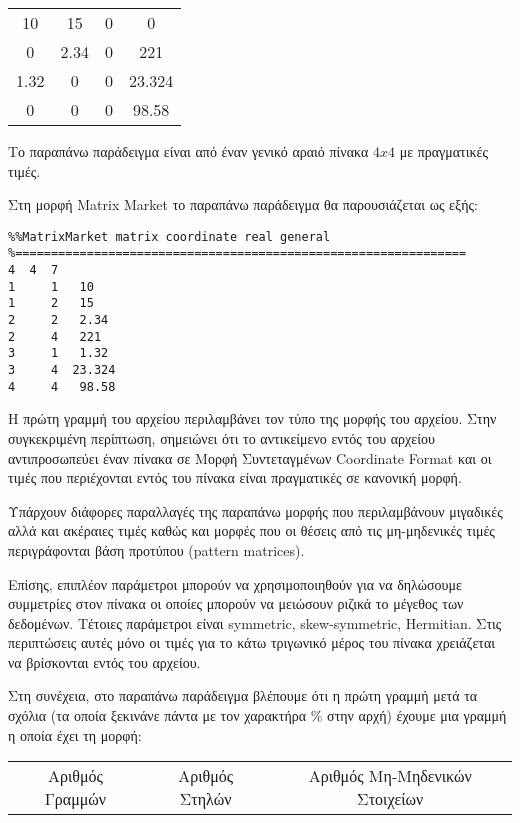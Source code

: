 \begin{center}
\begin{tabular}{ c c c c}
 10 & 15 & 0 & 0 \\ 
 0 & 2.34 & 0 & 221 \\  
 1.32 & 0 & 0 & 23.324 \\
 0 & 0 & 0 & 98.58
\end{tabular}
\end{center}

Το παραπάνω παράδειγμα είναι από έναν γενικό αραιό πίνακα $4x4$ με πραγματικές τιμές.

Στη μορφή \textlatin{Matrix Market} το παραπάνω παράδειγμα θα παρουσιάζεται ως εξής:
\begin{verbatim}
%%MatrixMarket matrix coordinate real general
%===============================================================
4  4  7
1     1   10
1     2   15
2     2   2.34
2     4   221
3     1   1.32
3     4  23.324
4     4   98.58
\end{verbatim}
Η πρώτη γραμμή του αρχείου περιλαμβάνει τον τύπο της μορφής του αρχείου. Στην συγκεκριμένη περίπτωση, σημειώνει ότι το αντικείμενο εντός του αρχείου αντιπροσωπεύει έναν πίνακα σε Μορφή Συντεταγμένων \textlatin{Coordinate Format} και οι τιμές που περιέχονται εντός του πίνακα είναι πραγματικές σε κανονική μορφή.

Υπάρχουν διάφορες παραλλαγές της παραπάνω μορφής που περιλαμβάνουν μιγαδικές αλλά και ακέραιες τιμές καθώς και μορφές που οι θέσεις από τις μη-μηδενικές τιμές περιγράφονται βάση προτύπου (\textlatin{pattern matrices}).

Επίσης, επιπλέον παράμετροι μπορούν να χρησιμοποιηθούν για να δηλώσουμε συμμετρίες στον πίνακα οι οποίες μπορούν να μειώσουν ριζικά το μέγεθος των δεδομένων. Τέτοιες παράμετροι είναι \textlatin{symmetric, skew-symmetric, Hermitian}. Στις περιπτώσεις αυτές μόνο οι τιμές για το κάτω τριγωνικό μέρος του πίνακα χρειάζεται να βρίσκονται εντός του αρχείου.

Στη συνέχεια, στο παραπάνω παράδειγμα βλέπουμε ότι η πρώτη γραμμή μετά τα σχόλια (τα οποία ξεκινάνε πάντα με τον χαρακτήρα \% στην αρχή) έχουμε μια γραμμή η οποία έχει τη μορφή:\\

\begin{center}
\begin{tabular}{ c c c }
 Αριθμός Γραμμών & Αριθμός Στηλών & Αριθμός Μη-Μηδενικών Στοιχείων
\end{tabular}
\end{center}

